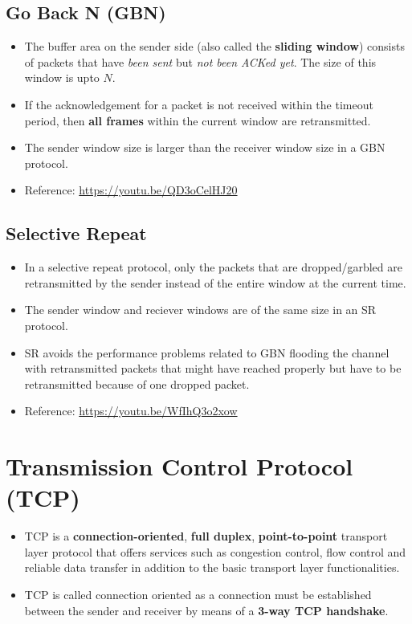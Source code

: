 \documentclass{article}
\theoremstyle{plain}
\theoremstyle{definition}
\begin{document}
\subsection{Go Back N (GBN)}
\begin{itemize}
    \item The buffer area on the sender side (also called the \textbf{sliding window}) consists of packets that have \textit{been sent} but \textit{not been ACKed yet}. The size of this window is upto $N$. 
    
    \item If the acknowledgement for a packet is not received within the timeout period, then \textbf{all frames} within the current window are retransmitted. 
    
    \item The sender window size is larger than the receiver window size in a GBN protocol. 
    
    \item Reference: \url{https://youtu.be/QD3oCelHJ20}
\end{itemize}

\subsection{Selective Repeat}
\begin{itemize}

    \item In a selective repeat protocol, only the packets that are dropped/garbled are retransmitted by the sender instead of the entire window at the current time. 
    
    \item The sender window and reciever windows are of the same size in an SR protocol. 
    
    \item SR avoids the performance problems related to GBN flooding the channel with retransmitted packets that might have reached properly but have to be retransmitted because of one dropped packet.
    
    \item Reference: \url{https://youtu.be/WfIhQ3o2xow}
\end{itemize}

\section{Transmission Control Protocol (TCP)}
\begin{itemize}
    \item TCP is a \textbf{connection-oriented}, \textbf{full duplex}, \textbf{point-to-point} transport layer protocol that offers services such as congestion control, flow control and reliable data transfer in addition to the basic transport layer functionalities. 
    
    \item TCP is called connection oriented as a connection must be established between the sender and receiver by means of a \textbf{3-way TCP handshake}.
\end{itemize}
\end{document}

